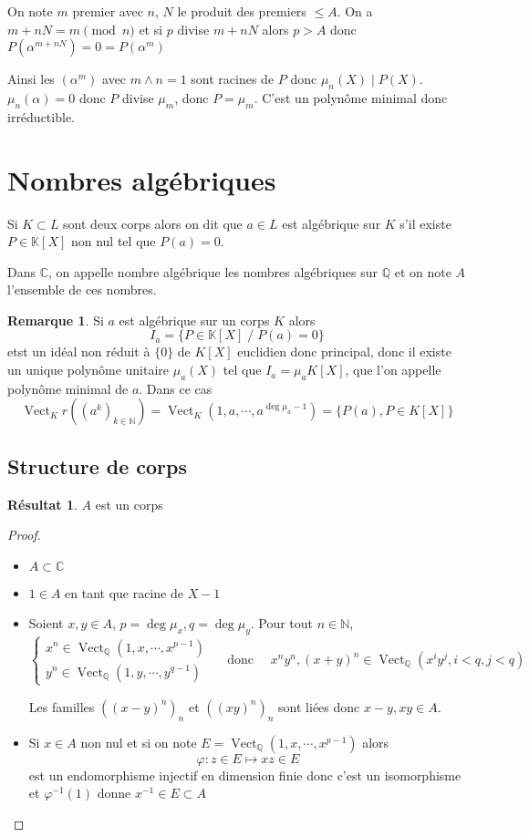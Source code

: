 \documentclass{article}
\theoremstyle{definition}
\newtheorem*{rem}{Remarque}
\newtheorem*{res}{Résultat}
\DeclareMathOperator{\Vect}{Vect}
\begin{document}
On note $m$ premier avec $n$, $N$ le produit des premiers $\leq A$. On a $m+nN=m\pmod n$ et si $p$ divise $m+nN$ alors $p>A$ donc $P(\alpha^{m+nN})=0=P(\alpha^m)$

Ainsi les $(\alpha^{m})$ avec $m\land n=1$ sont racines de $P$ donc $\mu_n(X) \;|\; P(X)$. $\mu_n(\alpha)=0$ donc $P$ divise $\mu_m$, donc $P=\mu_m$. C'est un polynôme minimal donc irréductible.

\section{Nombres algébriques}

Si $K\subset L$ sont deux corps alors on dit que $a\in L$ est algébrique sur $K$ s'il existe $P\in\mathbb K[X]$ non nul tel que $P(a)=0$.

Dans $\mathbb C$, on appelle nombre algébrique les nombres algébriques sur $\mathbb Q$ et on note $A$ l'ensemble de ces nombres.

\begin{rem}
Si $a$ est algébrique sur un corps $K$ alors \[
    I_a=\{P\in\mathbb K[X]\;/\; P(a)=0\}
\]
etst un idéal non réduit à $\{0\}$ de $K[X]$ euclidien donc principal, donc il existe un unique polynôme unitaire $\mu_a(X)$ tel que $I_a=\mu_a K[X]$, que l'on appelle polynôme minimal de $a$. Dans ce cas \[
    \Vect_Kr((a^k)_{k\in\mathbb N})=\Vect_K(1, a, \cdots, a^{\deg \mu_a-1})=\{P(a), P\in K[X]\}
\]
\end{rem}

\subsection{Structure de corps}

\begin{res}
$A$ est un corps
\end{res}

\begin{proof}
\begin{itemize}
    \item $A\subset \mathbb C$
    \item $1\in A$ en tant que racine de $X-1$
    \item Soient $x, y\in A$, $p=\deg \mu_x, q=\deg \mu_y$. Pour tout $n\in\mathbb N$, \[
        \begin{cases}
            x^n\in\Vect_{\mathbb Q}(1, x, \cdots, x^{p-1}) \\ y^n\in\Vect_{\mathbb Q}(1, y, \cdots, y^{q-1}) 
        \end{cases}\quad\text{ donc }\quad  x^ny^n, (x+y)^n\in\Vect_{\mathbb Q}(x^iy^j, i<q, j<q)
    \]
    
    Les familles $((x-y)^n)_n$ et $((xy)^n)_n$ sont liées donc $x-y, xy\in A$.
    \item Si $x\in A$ non nul et si on note $E=\Vect_{\mathbb Q}(1, x, \cdots, x^{p-1})$ alors \[
        \varphi: z\in E\longmapsto xz\in E
    \]
    est un endomorphisme injectif en dimension finie donc c'est un isomorphisme et $\varphi^{-1}(1)$ donne $x^{-1}\in E\subset A$
\end{itemize}
\end{proof}
\end{document}
